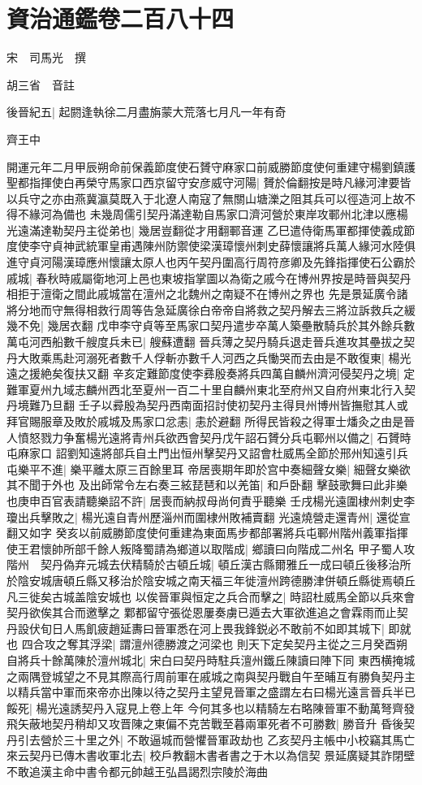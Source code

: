 \chapter{資治通鑑卷二百八十四}
宋　司馬光　撰

胡三省　音註

後晉紀五|{
	起閼逢執徐二月盡旃蒙大荒落七月凡一年有奇}


齊王中

開運元年二月甲辰朔命前保義節度使石贇守麻家口前威勝節度使何重建守楊劉鎮護聖都指揮使白再榮守馬家口西京留守安彦威守河陽|{
	贇於倫翻按是時凡緣河津要皆以兵守之亦由燕冀瀛莫既入于北遼人南寇了無關山塘濼之阻其兵可以徑造河上故不得不緣河為備也}
未幾周儒引契丹滿達勒自馬家口濟河營於東岸攻鄆州北津以應楊光遠滿達勒契丹主從弟也|{
	幾居豈翻從才用翻鄆音運}
乙巳遣侍衛馬軍都揮使義成節度使李守貞神武統軍皇甫遇陳州防禦使梁漢璋懷州刺史薛懷讓將兵萬人緣河水陸俱進守貞河陽漢璋應州懷讓太原人也丙午契丹圍高行周符彦卿及先鋒指揮使石公霸於戚城|{
	春秋時戚屬衛地河上邑也東坡指掌圖以為衛之戚今在博州界按是時晉與契丹相拒于澶衛之間此戚城當在澶州之北魏州之南疑不在博州之界也}
先是景延廣令諸將分地而守無得相救行周等告急延廣徐白帝帝自將救之契丹解去三將泣訴救兵之緩幾不免|{
	幾居衣翻}
戊申李守貞等至馬家口契丹遣步卒萬人築壘散騎兵於其外餘兵數萬屯河西船數千艘度兵未已|{
	艘蘇遭翻}
晉兵薄之契丹騎兵退走晉兵進攻其壘拔之契丹大敗乘馬赴河溺死者數千人俘斬亦數千人河西之兵慟哭而去由是不敢復東|{
	楊光遠之援絶矣復扶又翻}
辛亥定難節度使李彞殷奏將兵四萬自麟州濟河侵契丹之境|{
	定難軍夏州九域志麟州西北至夏州一百二十里自麟州東北至府州又自府州東北行入契丹境難乃旦翻}
壬子以彛殷為契丹西南面招討使初契丹主得貝州博州皆撫慰其人或拜官賜服章及敗於戚城及馬家口忿恚|{
	恚於避翻}
所得民皆殺之得軍士燔灸之由是晉人憤怒戮力争奮楊光遠將青州兵欲西會契丹戊午詔石贇分兵屯鄆州以備之|{
	石贇時屯麻家口}
詔劉知遠將部兵自土門出恒州擊契丹又詔會杜威馬全節於邢州知遠引兵屯樂平不進|{
	樂平離太原三百餘里耳}
帝居喪期年即於宫中奏細聲女樂|{
	細聲女樂欲其不聞于外也}
及出師常令左右奏三絃琵琶和以羌笛|{
	和戶卧翻}
擊鼓歌舞曰此非樂也庚申百官表請聽樂詔不許|{
	居喪而納叔母尚何責乎聽樂}
壬戌楊光遠圍棣州刺史李瓊出兵擊敗之|{
	楊光遠自青州歷淄州而圍棣州敗補賣翻}
光遠燒營走還青州|{
	還從宣翻又如字}
癸亥以前威勝節度使何重建為東面馬步都部署將兵屯鄆州階州義軍指揮使王君懷帥所部千餘人叛降蜀請為鄉道以取階成|{
	鄉讀曰向階成二州名}
甲子蜀人攻階州　契丹偽弃元城去伏精騎於古頓丘城|{
	頓丘漢古縣爾雅丘一成曰頓丘後移治所於陰安城唐頓丘縣又移治於陰安城之南天福三年徙澶州跨德勝津併頓丘縣徙焉頓丘凡三徙矣古城盖陰安城也}
以俟晉軍與恒定之兵合而擊之|{
	時詔杜威馬全節以兵來會契丹欲俟其合而邀擊之}
鄴都留守張從恩屢奏虜已遁去大軍欲進追之會霖雨而止契丹設伏旬日人馬飢疲趙延夀曰晉軍悉在河上畏我鋒鋭必不敢前不如即其城下|{
	即就也}
四合攻之奪其浮梁|{
	謂澶州德勝渡之河梁也}
則天下定矣契丹主從之三月癸酉朔自將兵十餘萬陳於澶州城北|{
	宋白曰契丹時駐兵澶州鐵丘陳讀曰陣下同}
東西横掩城之兩隅登城望之不見其際高行周前軍在戚城之南與契丹戰自午至晡互有勝負契丹主以精兵當中軍而來帝亦出陳以待之契丹主望見晉軍之盛謂左右曰楊光遠言晉兵半已餒死|{
	楊光遠誘契丹入寇見上卷上年}
今何其多也以精騎左右略陳晉軍不動萬弩齊發飛矢蔽地契丹稍却又攻晋陳之東偏不克苦戰至暮兩軍死者不可勝數|{
	勝音升}
昏後契丹引去營於三十里之外|{
	不敢逼城而營懼晉軍政劫也}
乙亥契丹主帳中小校竊其馬亡來云契丹已傳木書收軍北去|{
	校戶教翻木書者書之于木以為信契}
景延廣疑其詐閉壁不敢追漢主命中書令都元帥越王弘昌謁烈宗陵於海曲

